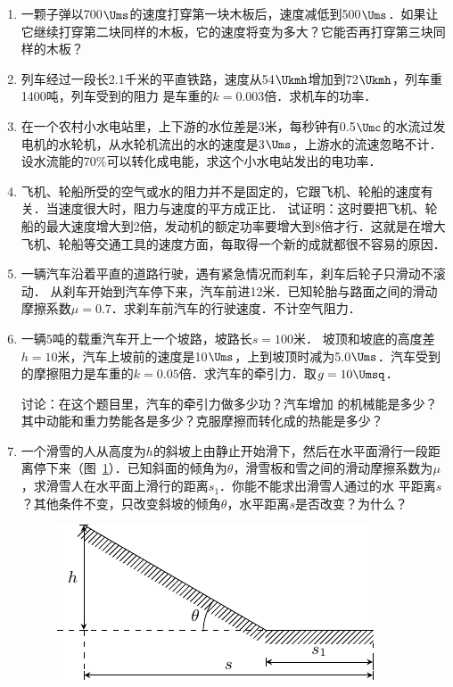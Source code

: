 \begin{enumerate}
\item  一颗子弹以700$\Ums$的速度打穿第一块木板后，速度减低到500$\Ums$．如果让它继续打穿第二块同样的木板，它的速度将变为多大？它能否再打穿第三块同样的木板？
\item  列车经过一段长2.1千米的平直铁路，速度从54$\Ukmh$增加到72$\Ukmh$，列车重1400吨，列车受到的阻力
是车重的$k=0.003$倍．求机车的功率．
\item  在一个农村小水电站里，上下游的水位差是3米，每秒钟有0.5$\Umc$的水流过发电机的水轮机，从水轮机流出的水的速度是3$\Ums$，上游水的流速忽略不计．设水流能的70\%可以转化成电能，求这个小水电站发出的电功率．
\item  飞机、轮船所受的空气或水的阻力并不是固定的，它跟飞机、轮船的速度有关．当速度很大时，阻力与速度的平方成正比．
试证明：这时要把飞机、轮船的最大速度增大到2倍，发动机的额定功率要增大到8倍才行．这就是在增大飞机、轮船等交通工具的速度方面，每取得一个新的成就都很不容易的原因．
\item 一辆汽车沿着平直的道路行驶，遇有紧急情况而刹车，刹车后轮子只滑动不滚动．
从刹车开始到汽车停下来，汽车前进12米．已知轮胎与路面之间的滑动摩擦系数$\mu=0.7$．求刹车前汽车的行驶速度．不计空气阻力．
\item 一辆5吨的载重汽车开上一个坡路，坡路长$s=100$米．
坡顶和坡底的高度差$h=10$米，汽车上坡前的速度是10$\Ums$，上到坡顶时减为5.0$\Ums$．汽车受到的摩擦阻力是车重的$k=0.05$倍．求汽车的牵引力．取$g=10\Umsq$．
 
讨论：在这个题目里，汽车的牵引力做多少功？汽车增加
的机械能是多少？其中动能和重力势能各是多少？克服摩擦而转化成的热能是多少？
\item 一个滑雪的人从高度为$h$的斜坡上由静止开始滑下，然后在水平面滑行一段距离停下来（图~\ref{fig_A_7-24}）．已知斜面的倾角为$\theta$，滑雪板和雪之间的滑动摩擦系数为$\mu$，求滑雪人在水平面上滑行的距离$s_1$．你能不能求出滑雪人通过的水
平距离$s$？其他条件不变，只改变斜坡的倾角$\theta$，水平距离$s$是否改变？为什么？
\begin{figure}[htbp]
    \centering
    \includegraphics{fig/A/7-24.pdf}
    \caption{}\label{fig_A_7-24}
\end{figure}


\end{enumerate}
